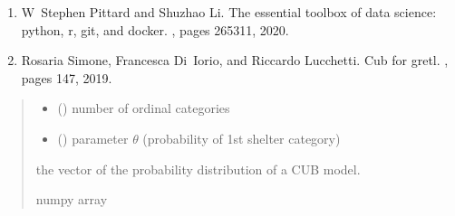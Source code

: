 \documentclass[letterpaper,10pt,english]{sphinxmanual}
\begin{document}
\begin{fulllineitems}
\begin{description}
\begin{enumerate}
\item {} 
\sphinxAtStartPar
W Stephen Pittard and Shuzhao Li. The essential toolbox of data science: python, r, git, and docker. , pages 265\textendash{}311, 2020.

\item {} 
\sphinxAtStartPar
Rosaria Simone, Francesca Di Iorio, and Riccardo Lucchetti. Cub for gretl. , pages 147, 2019.

\end{enumerate}

\end{description}
\begin{quote}\begin{description}
\begin{itemize}
\item {} 
\sphinxAtStartPar
{} () \textendash{} number of ordinal categories

\item {} 
\sphinxAtStartPar
{} () \textendash{} parameter \(\theta\) (probability of 1st shelter category)

\end{itemize}

\sphinxAtStartPar
the vector of the probability distribution of a CUB model.

\sphinxAtStartPar
numpy array

\end{description}\end{quote}

\end{fulllineitems}

\end{document}
